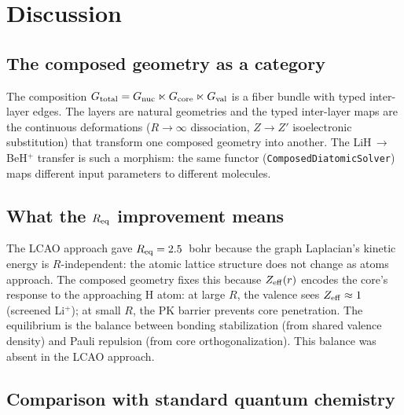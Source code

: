 \documentclass[aps,pra,twocolumn,superscriptaddress,longbibliography,floatfix]{revtex4-2}
\begin{document}
\section{Discussion}
\label{sec:discussion}

\subsection{The composed geometry as a category}
\label{sec:category}

The composition $G_{\rm total} = G_{\rm nuc} \ltimes G_{\rm core}
\ltimes G_{\rm val}$ is a fiber bundle with typed inter-layer edges.
The layers are natural
geometries and the typed inter-layer maps are the continuous deformations
($R \to \infty$ dissociation, $Z \to Z'$ isoelectronic substitution)
that transform one composed geometry into another.  The
LiH$\,{\to}\,$BeH$^+$ transfer is such a morphism: the same functor
(\texttt{ComposedDiatomicSolver}) maps different input parameters to
different molecules.



\subsection{What the $R_{\rm eq}$ improvement means}
\label{sec:req}

The LCAO approach gave $R_{\rm eq} = 2.5$~bohr because the graph
Laplacian's kinetic energy is $R$-independent: the atomic lattice
structure does not change as atoms approach.  The composed geometry
fixes this because $Z_{\rm eff}(r)$ encodes the core's response to the
approaching H atom: at large $R$, the valence sees $Z_{\rm eff} \approx 1$
(screened Li$^+$); at small $R$, the PK barrier prevents core
penetration.  The equilibrium is the balance between bonding
stabilization (from shared valence density) and Pauli repulsion (from
core orthogonalization).  This balance was absent in the LCAO approach.


\subsection{Comparison with standard quantum chemistry}
\label{sec:comparison}
\end{document}
